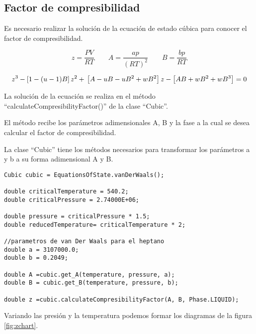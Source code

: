 \subsection{Factor de compresibilidad}\label{subsec:compresibilityFactor}

Es necesario realizar la solución de la ecuación de estado cúbica para conocer el factor de compresibilidad.

\begin{equation}
z= \frac{P V}{R T}
\qquad
A=\frac{ap}{(RT)^2}
\qquad
B=\frac{bp}{RT}
\end{equation}

\begin{equation}
z^3-\left[1-(u-1)B\right]z^2+ \\ \left[A-uB-uB^2 +\\ wB^2\right]z-\left[AB+wB^2+wB^3\right]=0
\end{equation}


La solución de la ecuación se realiza en el método ``calculateCompresibilityFactor()'' de la clase ``Cubic''.

El método recibe los parámetros adimensionales A, B y la fase a la cual se desea calcular el factor de compresibilidad.

La clase ``Cubic'' tiene los métodos necesarios para transformar los parámetros a y b a su forma adimensional A y B.

\begin{lstlisting}[label=se,caption={Cálculo del factor de compresibilidad, y adimensionamiento de los parámetros a y b con la clase ``Cubic''}]
Cubic cubic = EquationsOfState.vanDerWaals();
		
double criticalTemperature = 540.2;
double criticalPressure = 2.74000E+06;

double pressure = criticalPressure * 1.5;
double reducedTemperature= criticalTemperature * 2;

//parametros de van Der Waals para el heptano
double a = 3107000.0;
double b = 0.2049;

double A =cubic.get_A(temperature, pressure, a);
double B = cubic.get_B(temperature, pressure, b);

double z =cubic.calculateCompresibilityFactor(A, B, Phase.LIQUID);
\end{lstlisting}
 
	Variando las presión y la temperatura podemos formar los diagramas de la figura \ref{fig:zchart}.

